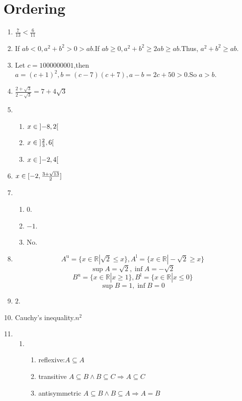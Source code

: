 \documentclass[12pt]{article}
\begin{document}
\section{Ordering}
\begin{enumerate}
    \item $\frac{7}{13}<\frac{6}{11}$
    \item If $ab<0,a^2+b^2>0>ab$.If $ab\ge 0,a^2+b^2\ge 2ab\ge ab $.Thus, $a^2+b^2\ge ab$.
    \item Let $c=1000000001$,then $a=(c+1)^2,b=(c-7)(c+7),a-b=2c+50>0$.So $a>b$.
    \item $\frac{2+\sqrt{3}}{2-\sqrt{3}}=7+4\sqrt{3}$
    \item 
        \begin{enumerate}
            \item $x\in \interval[open]{-8}{2}$
            \item $x\in \interval[open]{\frac{2}{3}}{6}$
            \item $x\in \interval[open]{-2}{4}$
        \end{enumerate}
    \item $x\in \interval{-2}{\frac{3+\sqrt{13}}{2}}$
    \item 
        \begin{enumerate}
            \item $0$.
            \item $-1$.
            \item No.
        \end{enumerate}
    \item $$A^\mathrm{u}=\{x\in \mathbb{R} |\sqrt{2}\le x\},A^\mathrm{l}=\{x\in \mathbb{R}|-\sqrt{2}\ge x\}$$
       $$\sup A=\sqrt{2},\inf A=-\sqrt{2}$$
       $$B^\mathrm{u}=\{x\in \mathbb{R}|x\ge 1\},B^\mathrm{l}=\{x\in \mathbb{R}|x\le 0\}$$ 
       $$\sup B=1,\inf B=0$$
    \item $2$.
    \item  Cauchy's inequality.$n^2$
    \item 
        \begin{enumerate}
            \item 
                \begin{enumerate}
                    \item reflexive:$A\subseteq A$
                    \item transitive $A\subseteq B\wedge B\subseteq C\Rightarrow A\subseteq C$
                    \item antisymmetric $A\subseteq B\wedge B\subseteq A\Rightarrow A=B$

\end{enumerate}
\end{enumerate}
\end{enumerate}
\end{document}
